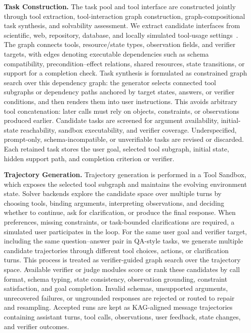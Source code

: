 \textbf{Task Construction.} The task pool and tool interface are constructed jointly through tool extraction, tool-interaction graph construction, graph-compositional task synthesis, and solvability assessment. We extract candidate interfaces from scientific, web, repository, database, and locally simulated tool-usage settings~\citep{barres2025tau2,he2025vitabench}. The graph connects tools, resource/state types, observation fields, and verifier targets, with edges denoting executable dependencies such as schema compatibility, precondition--effect relations, shared resources, state transitions, or support for a completion check. Task synthesis is formulated as constrained graph search over this dependency graph: the generator selects connected tool subgraphs or dependency paths anchored by target states, answers, or verifier conditions, and then renders them into user instructions. This avoids arbitrary tool concatenation: later calls must rely on objects, constraints, or observations produced earlier. Candidate tasks are screened for argument availability, initial-state reachability, sandbox executability, and verifier coverage. Underspecified, prompt-only, schema-incompatible, or unverifiable tasks are revised or discarded. Each retained task stores the user goal, selected tool subgraph, initial state, hidden support path, and completion criterion or verifier.

\textbf{Trajectory Generation.} Trajectory generation is performed in a Tool Sandbox, which exposes the selected tool subgraph and maintains the evolving environment state. Solver backends explore the candidate space over multiple turns by choosing tools, binding arguments, interpreting observations, and deciding whether to continue, ask for clarification, or produce the final response. When preferences, missing constraints, or task-bounded clarifications are required, a simulated user participates in the loop. For the same user goal and verifier target, including the same question--answer pair in QA-style tasks, we generate multiple candidate trajectories through different tool choices, actions, or clarification turns. This process is treated as verifier-guided graph search over the trajectory space. Available verifier or judge modules score or rank these candidates by call format, schema typing, state consistency, observation grounding, constraint satisfaction, and goal completion. Invalid schemas, unsupported arguments, unrecovered failures, or ungrounded responses are rejected or routed to repair and resampling. Accepted runs are kept as KAG-aligned message trajectories containing assistant turns, tool calls, observations, user feedback, state changes, and verifier outcomes.